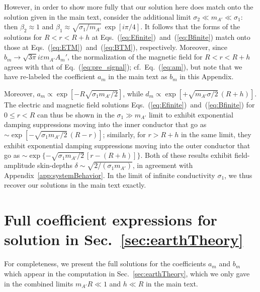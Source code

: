 \documentclass[amsmath,amssymb,aps,10pt,prd,letterpaper,nofootinbib,balancelastpage,notitlepage,superscriptaddress,twocolumn,floatfix]{revtex4-2}
\newcommand{\secref}[2][]{Sec{#1}.~\ref{#2}}		%
\newcommand{\appref}[2][x]{Appendi{#1}~\ref{#2}}	%
\renewcommand{\eqref}[2][]{Eq{#1}.~(\ref{eq:#2})}	%
\begin{document}
However, in order to show more fully that our solution here does match onto the solution given in the main text, consider the additional limit $\sigma_2 \ll m_{A'} \ll \sigma_1$: then $\beta_2\approx1$ and $\beta_1 \approx \sqrt{\sigma_1/m_{A'}}\,\exp[i\pi/4]$.
It follows that the forms of the solutions for $R<r<R+h$ at \eqref[s]{Efinite}~and~(\ref{eq:Bfinite}) match onto those at \eqref[s]{ETM}~and~(\ref{eq:BTM}), respectively.
Moreover, since $b_m \rightarrow \sqrt{3\pi}i\varepsilon m_{A'}A_m'$, the normalization of the magnetic field for $R<r<R+h$ agrees with that of \eqref{pre_signal}; cf.~\eqref{am}, but note that we have re-labeled the coefficient $a_m$ in the main text as $b_m$ in this Appendix.

Moreover, $a_m \propto \exp[-R\sqrt{\sigma_1 m_{A'}/2}]$, while $d_m \propto \exp[ + \sqrt{m_{A'} \sigma/2}\, (R+h) ]$. 
The electric and magnetic field solutions \eqref[s]{Efinite}~and~(\ref{eq:Bfinite}) for $0\leq r<R$ can thus be shown in the $\sigma_1 \gg m_{A'}$ limit to exhibit exponential damping suppressions moving into the inner conductor that go as $\sim \exp[ - \sqrt{\sigma_1 m_{A'}/2}\, ( R - r ) ]$; similarly, for $r>R+h$ in the same limit, they exhibit exponential damping suppressions moving into the outer conductor that go as $\sim \exp\{ - \sqrt{\sigma_1 m_{A'}/2}\, [ r  - (R+h) ] \}$.
Both of these results exhibit field-amplitude skin-depths $\delta \sim \sqrt{2/(\sigma_1 m_{A'})}$, in agreement with \appref{app:systemBehavior}.
In the limit of infinite conductivity $\sigma_1$, we thus recover our solutions in the main text exactly.


\section{Full coefficient expressions for solution \texorpdfstring{in \secref{sec:earthTheory}}{for Model 1}}
\label{app:fullCoeffModel1}

For completeness, we present the full solutions for the coefficients $a_m$ and $b_m$ which appear in the computation in \secref{sec:earthTheory}, which we only gave in the combined limits $m_{A'}R\ll1$ and $h\ll R$ in the main text.
\end{document}
